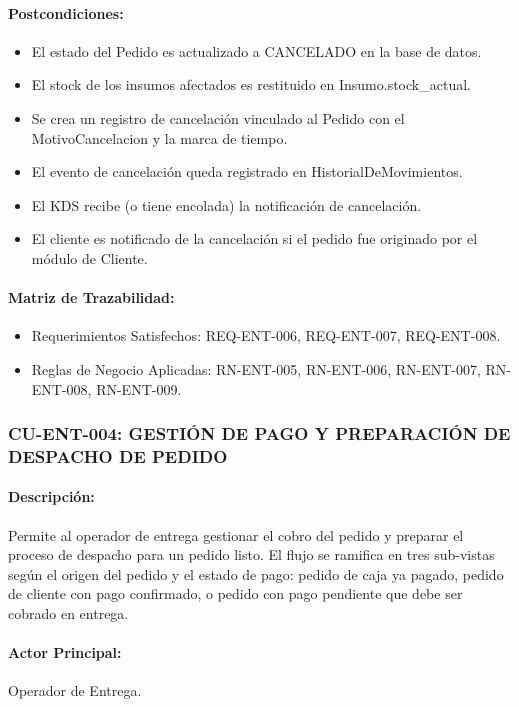 \paragraph{Postcondiciones:}
\begin{itemize}
    \item El estado del Pedido es actualizado a CANCELADO en la base de datos.
    \item El stock de los insumos afectados es restituido en Insumo.stock\_actual.
    \item Se crea un registro de cancelación vinculado al Pedido con el MotivoCancelacion y la marca de tiempo.
    \item El evento de cancelación queda registrado en HistorialDeMovimientos.
    \item El KDS recibe (o tiene encolada) la notificación de cancelación.
    \item El cliente es notificado de la cancelación si el pedido fue originado por el módulo de Cliente.
\end{itemize}

\paragraph{Matriz de Trazabilidad:}
\begin{itemize}
    \item Requerimientos Satisfechos: REQ-ENT-006, REQ-ENT-007, REQ-ENT-008.
    \item Reglas de Negocio Aplicadas: RN-ENT-005, RN-ENT-006, RN-ENT-007, RN-ENT-008, RN-ENT-009.
\end{itemize}

\subsubsection{CU-ENT-004: GESTIÓN DE PAGO Y PREPARACIÓN DE DESPACHO DE PEDIDO}
\paragraph{Descripción:} Permite al operador de entrega gestionar el cobro del pedido y preparar el proceso de despacho para un pedido listo. El flujo se ramifica en tres sub-vistas según el origen del pedido y el estado de pago: pedido de caja ya pagado, pedido de cliente con pago confirmado, o pedido con pago pendiente que debe ser cobrado en entrega.

\paragraph{Actor Principal:} Operador de Entrega.

